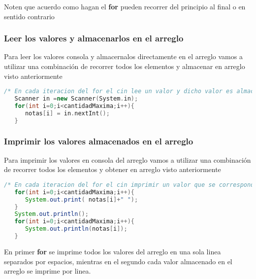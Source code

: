 Noten que acuerdo como hagan el \textbf{for} pueden recorrer del principio al final o en sentido contrario

\subsubsection{Leer los valores y almacenarlos en el arreglo}
Para leer los valores consola y almacernalos directamente en el arreglo vamos a utilizar una combinación de recorrer todos los elementos y almacenar en arreglo visto anteriormente

\begin{lstlisting}[language=C++]
   /* En cada iteracion del for el cin lee un valor y dicho valor es almacenado en el arreglo en la posicion que indique el valor de la variable i en esa iteracion, en la primera el valor seria 0, en la segunda 1 y asi sucesivamente. Tener en cuenta que los valores de i esten en rango de posiciones validas del arreglo */
   Scanner in =new Scanner(System.in);
   for(int i=0;i<cantidadMaxima;i++){
      notas[i] = in.nextInt();
   }
\end{lstlisting}

\subsubsection{Imprimir los valores almacenados en el arreglo}

Para imprimir los valores en consola del arreglo vamos a utilizar una combinación de recorrer todos los elementos y obtener en arreglo visto anteriormente

\begin{lstlisting}[language=Java]
   /* En cada iteracion del for el cin imprimir un valor que se corresponde con el almacenado en el arreglo en la posicion que indique el valor de la variable i en esa iteracion, en la primera el valor seria 0, en la segunda 1 y asi sucesivamente. Tener en cuenta que los valores de i esten en rango de posiciones validas del arreglo */
   for(int i=0;i<cantidadMaxima;i++){
      System.out.print( notas[i]+" ");
   }
   System.out.println();
   for(int i=0;i<cantidadMaxima;i++){
      System.out.println(notas[i]);
   } 
\end{lstlisting}

En primer \textbf{for} se imprime todos los valores del arreglo en una sola linea separados por espacios, mientras en el segundo cada valor almacenado en el arreglo se imprime por linea.